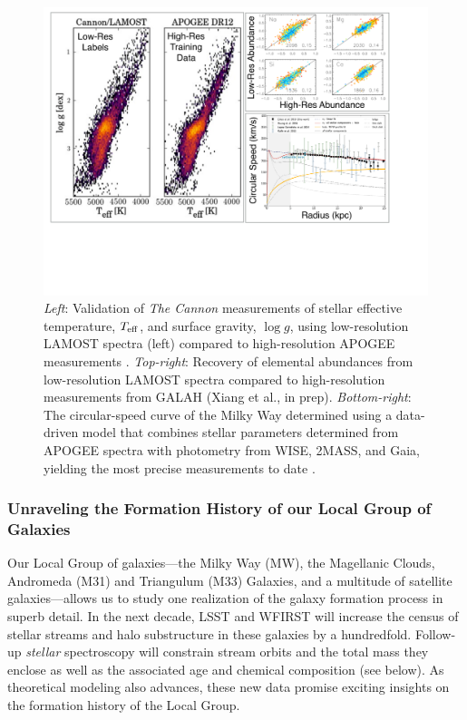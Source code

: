 \documentclass[oneside,11pt]{amsart}
\begin{document}
\begin{figure}[h!]
%
\vskip -0.1in
%
\includegraphics[width=\textwidth]{figs/LGplots}
%
\caption{{\it Left}: Validation of {\it The Cannon} measurements of
stellar effective temperature, $T_{\rm eff}$, and surface gravity, $\log
g$, using low-resolution LAMOST spectra (left) compared to
high-resolution APOGEE measurements
\citep[right;][]{2017ApJ...836....5H}. {\it Top-right}: Recovery of
elemental abundances from low-resolution LAMOST spectra compared to
high-resolution measurements from GALAH (Xiang et al., in prep).  {\it
Bottom-right}: The circular-speed curve of the Milky Way determined
using a data-driven model that combines stellar parameters determined
from APOGEE spectra with photometry from WISE, 2MASS, and Gaia, yielding
the most precise measurements to date \citep{2019ApJ...871..120E}.}
%
\label{fig:Cannon}
%
\end{figure}

\subsubsection{Unraveling the Formation History of our Local Group of Galaxies}
\label{sec:localgroup}

Our Local Group of galaxies---the Milky Way (MW), the Magellanic Clouds,
Andromeda (M31) and Triangulum (M33) Galaxies, and a multitude of
satellite galaxies---allows us to study one realization of the galaxy
formation process in superb detail.  In the next decade, LSST and WFIRST
will increase the census of stellar streams and halo substructure in
these galaxies by a hundredfold.  Follow-up \emph{stellar} spectroscopy
will constrain stream orbits and the total mass they enclose
\citep{2017ApJ...836..234S} as well as the associated age and chemical
composition (see below).
As theoretical modeling also advances, these new data promise exciting
insights on the formation history of the Local Group.
\end{document}
